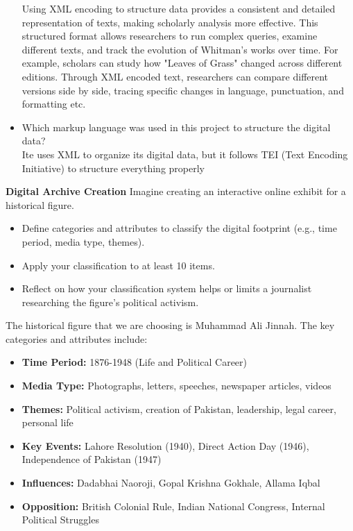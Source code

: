 \documentclass[a4paper]{exam}
\begin{document}
\begin{questions}
\begin{itemize}
    
    Using XML encoding to structure data provides a consistent and detailed representation of texts, making scholarly analysis more effective. This structured format allows researchers to run complex queries, examine different texts, and track the evolution of Whitman’s works over time. For example, scholars can study how "Leaves of Grass" changed across different editions. Through XML encoded text, researchers can compare different versions side by side, tracing specific changes in language, punctuation, and formatting etc.
    \item Which markup language was used in this project to structure the digital data?
    \\
    
    Ite uses XML to organize its digital data, but it follows TEI (Text Encoding Initiative)  to structure everything properly
\end{itemize}

\vspace{6cm}

\question[15] \textbf{Digital Archive Creation} Imagine creating an interactive online exhibit for a historical figure. 
\begin{itemize}
    \item Define categories and attributes to classify the digital footprint (e.g., time period, media type, themes).
    \item Apply your classification to at least 10 items.
    \item Reflect on how your classification system helps or limits a journalist researching the figure’s political activism.
\end{itemize}

The historical figure that we are choosing is Muhammad Ali Jinnah. The key categories and attributes include:

\begin{itemize}
    \item \textbf{Time Period:} 1876-1948 (Life and Political Career)
    \item \textbf{Media Type:} Photographs, letters, speeches, newspaper articles, videos
    \item \textbf{Themes:} Political activism, creation of Pakistan, leadership, legal career, personal life
    \item \textbf{Key Events:} Lahore Resolution (1940), Direct Action Day (1946), Independence of Pakistan (1947)
    \item \textbf{Influences:} Dadabhai Naoroji, Gopal Krishna Gokhale, Allama Iqbal
    \item \textbf{Opposition:} British Colonial Rule, Indian National Congress, Internal Political Struggles
\end{itemize}


\end{questions}
\end{document}
